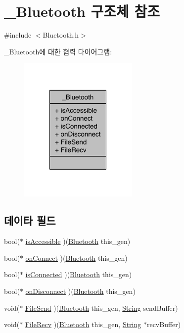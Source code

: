 \hypertarget{struct___bluetooth}{\section{\-\_\-\-Bluetooth 구조체 참조}
\label{struct___bluetooth}
}


{\ttfamily \#include $<$Bluetooth.\-h$>$}



\-\_\-\-Bluetooth에 대한 협력 다이어그램\-:\nopagebreak
\begin{figure}[H]
\begin{center}
\leavevmode
\includegraphics[width=164pt]{db/d48/struct___bluetooth__coll__graph}
\end{center}
\end{figure}
\subsection*{데이타 필드}
\begin{DoxyCompactItemize}
\item 
bool($\ast$ \hyperlink{struct___bluetooth_a4d17357ef3f36198ec75747159ba463e}{is\-Accessible} )(\hyperlink{_bluetooth_8h_aedee4f5eb0a22e2858979432e7f9825e}{Bluetooth} this\-\_\-gen)
\item 
bool($\ast$ \hyperlink{struct___bluetooth_a02ed8ce853ef7914c2d0663ddc85bf71}{on\-Connect} )(\hyperlink{_bluetooth_8h_aedee4f5eb0a22e2858979432e7f9825e}{Bluetooth} this\-\_\-gen)
\item 
bool($\ast$ \hyperlink{struct___bluetooth_afaf7348f13265482f31f6bb326de23d3}{is\-Connected} )(\hyperlink{_bluetooth_8h_aedee4f5eb0a22e2858979432e7f9825e}{Bluetooth} this\-\_\-gen)
\item 
bool($\ast$ \hyperlink{struct___bluetooth_a73fc8eb303afc5b6d5e9188e623f8d3d}{on\-Disconnect} )(\hyperlink{_bluetooth_8h_aedee4f5eb0a22e2858979432e7f9825e}{Bluetooth} this\-\_\-gen)
\item 
void($\ast$ \hyperlink{struct___bluetooth_aa113a2cd73c6888e3a7d4694c6d626e5}{File\-Send} )(\hyperlink{_bluetooth_8h_aedee4f5eb0a22e2858979432e7f9825e}{Bluetooth} this\-\_\-gen, \hyperlink{dit_8h_a2efe6d463d80744789f228f5dc4baa39}{String} send\-Buffer)
\item 
void($\ast$ \hyperlink{struct___bluetooth_a7c339952703ec4aa063f9db4a8561b85}{File\-Recv} )(\hyperlink{_bluetooth_8h_aedee4f5eb0a22e2858979432e7f9825e}{Bluetooth} this\-\_\-gen, \hyperlink{dit_8h_a2efe6d463d80744789f228f5dc4baa39}{String} $\ast$recv\-Buffer)
\end{DoxyCompactItemize}


